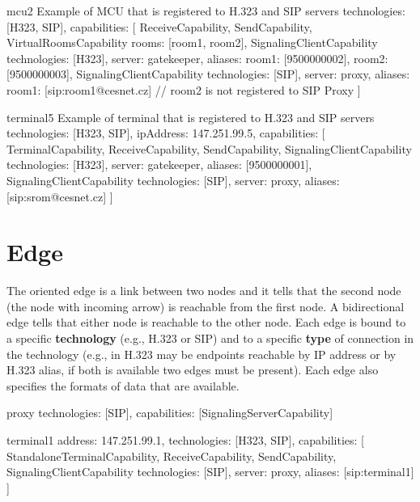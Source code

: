 \begin{itemize}
\begin{EntityExample}{}{mcu2}%
      {Example of MCU that is registered to H.323 and SIP servers}
technologies: [H323, SIP],
capabilities: [
  ReceiveCapability,
  SendCapability,
  VirtualRoomsCapability {rooms: [room1, room2]},
  SignalingClientCapability {technologies: [H323], server: gatekeeper,
    aliases: {room1: [9500000002], room2: [9500000003]}},
  SignalingClientCapability {technologies: [SIP], server: proxy,
    aliases: {room1: [sip:room1@cesnet.cz]}} 
     // room2 is not registered to SIP Proxy
]
\end{EntityExample}

\begin{EntityExample}{}{terminal5}%
      {Example of terminal that is registered to H.323 and SIP servers}
technologies: [H323, SIP],
ipAddress: 147.251.99.5,
capabilities: [
  TerminalCapability,
  ReceiveCapability,
  SendCapability,
  SignalingClientCapability {technologies: [H323], server: gatekeeper,
    aliases: [9500000001]},
  SignalingClientCapability {technologies: [SIP], server: proxy,
    aliases: [sip:srom@cesnet.cz]}
]
\end{EntityExample}

\end{itemize}
 

\section{Edge}

The oriented edge is a link between two nodes and it tells that the second 
node (the node with incoming arrow) is reachable from the first node. A 
bidirectional edge tells that either node is reachable to the other node. 
Each edge is bound to a specific \textbf{technology} (e.g., H.323 or SIP) and 
to a specific \textbf{type} of connection in the technology (e.g., in H.323 
may be endpoints reachable by IP address or by H.323 alias, if both is 
available two edges must be present). Each edge also specifies the formats of data that are available.

\begin{EntityExample}{}{proxy}{}
technologies: [SIP],
capabilities: [SignalingServerCapability]
\end{EntityExample}

\begin{EntityExample}{}{terminal1}{}
address: 147.251.99.1,
technologies: [H323, SIP],
capabilities: [
  StandaloneTerminalCapability,
  ReceiveCapability,
  SendCapability,
  SignalingClientCapability {technologies: [SIP], server: proxy, 
    aliases: [sip:terminal1]}
]
\end{EntityExample}

